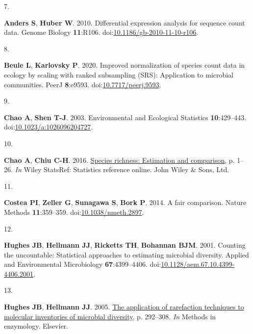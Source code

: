 \documentclass[
]{article}
\newlength{\cslhangindent}
\newlength{\csllabelwidth}
\newlength{\cslentryspacingunit} %
\newenvironment{CSLReferences}[2] %
 {%
  \setlength{\parindent}{0pt}
  \ifodd #1
  \let\oldpar\par
  \def\par{\hangindent=\cslhangindent\oldpar}
  \fi
  \setlength{\parskip}{#2\cslentryspacingunit}
 }%
 {}
\newcommand{\CSLLeftMargin}[1]{\parbox[t]{\csllabelwidth}{#1}}
\newcommand{\CSLRightInline}[1]{\parbox[t]{\linewidth - \csllabelwidth}{#1}\break}
\begin{document}
\begin{CSLReferences}{0}{1}
\leavevmode{}%
\CSLLeftMargin{7. }%
\CSLRightInline{\textbf{Anders S}, \textbf{Huber W}. 2010. Differential
expression analysis for sequence count data. Genome Biology
\textbf{11}:R106.
doi:\href{https://doi.org/10.1186/gb-2010-11-10-r106}{10.1186/gb-2010-11-10-r106}.}

\leavevmode{}%
\CSLLeftMargin{8. }%
\CSLRightInline{\textbf{Beule L}, \textbf{Karlovsky P}. 2020. Improved
normalization of species count data in ecology by scaling with ranked
subsampling (SRS): Application to microbial communities. PeerJ
\textbf{8}:e9593.
doi:\href{https://doi.org/10.7717/peerj.9593}{10.7717/peerj.9593}.}

\leavevmode{}%
\CSLLeftMargin{9. }%
\CSLRightInline{\textbf{Chao A}, \textbf{Shen T-J}. 2003. Environmental
and Ecological Statistics \textbf{10}:429--443.
doi:\href{https://doi.org/10.1023/a:1026096204727}{10.1023/a:1026096204727}.}

\leavevmode{}%
\CSLLeftMargin{10. }%
\CSLRightInline{\textbf{Chao A}, \textbf{Chiu C-H}. 2016.
\href{https://doi.org/10.1002/9781118445112.stat03432.pub2}{Species
richness: Estimation and comparison}, p. 1--26. \emph{In} Wiley
StatsRef: Statistics reference online. John Wiley \& Sons, Ltd.}

\leavevmode{}%
\CSLLeftMargin{11. }%
\CSLRightInline{\textbf{Costea PI}, \textbf{Zeller G}, \textbf{Sunagawa
S}, \textbf{Bork P}. 2014. A fair comparison. Nature Methods
\textbf{11}:359--359.
doi:\href{https://doi.org/10.1038/nmeth.2897}{10.1038/nmeth.2897}.}

\leavevmode{}%
\CSLLeftMargin{12. }%
\CSLRightInline{\textbf{Hughes JB}, \textbf{Hellmann JJ},
\textbf{Ricketts TH}, \textbf{Bohannan BJM}. 2001. Counting the
uncountable: Statistical approaches to estimating microbial diversity.
Applied and Environmental Microbiology \textbf{67}:4399--4406.
doi:\href{https://doi.org/10.1128/aem.67.10.4399-4406.2001}{10.1128/aem.67.10.4399-4406.2001}.}

\leavevmode{}%
\CSLLeftMargin{13. }%
\CSLRightInline{\textbf{Hughes JB}, \textbf{Hellmann JJ}. 2005.
\href{https://doi.org/10.1016/s0076-6879(05)97017-1}{The application of
rarefaction techniques to molecular inventories of microbial diversity},
p. 292--308. \emph{In} Methods in enzymology. Elsevier.}


\end{CSLReferences}
\end{document}
